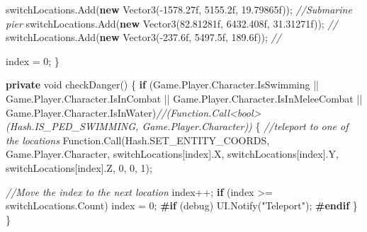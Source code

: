 \documentclass[
  openany]{book}
\newenvironment{Shaded}{\begin{snugshade}}{\end{snugshade}}
\newcommand{\CommentTok}[1]{\textcolor[rgb]{0.56,0.35,0.01}{\textit{#1}}}
\newcommand{\DataTypeTok}[1]{\textcolor[rgb]{0.13,0.29,0.53}{#1}}
\newcommand{\DecValTok}[1]{\textcolor[rgb]{0.00,0.00,0.81}{#1}}
\newcommand{\FloatTok}[1]{\textcolor[rgb]{0.00,0.00,0.81}{#1}}
\newcommand{\FunctionTok}[1]{\textcolor[rgb]{0.00,0.00,0.00}{#1}}
\newcommand{\KeywordTok}[1]{\textcolor[rgb]{0.13,0.29,0.53}{\textbf{#1}}}
\newcommand{\NormalTok}[1]{#1}
\newcommand{\StringTok}[1]{\textcolor[rgb]{0.31,0.60,0.02}{#1}}
\begin{document}
\begin{Shaded}
\begin{Highlighting}[]
\NormalTok{            switchLocations.}\FunctionTok{Add}\NormalTok{(}\KeywordTok{new} \FunctionTok{Vector3}\NormalTok{(-}\FloatTok{1578.27f}\NormalTok{, }\FloatTok{5155.2f}\NormalTok{, }\FloatTok{19.79865f}\NormalTok{)); }\CommentTok{//Submarine pier}
\NormalTok{            switchLocations.}\FunctionTok{Add}\NormalTok{(}\KeywordTok{new} \FunctionTok{Vector3}\NormalTok{(}\FloatTok{82.81281f}\NormalTok{, }\FloatTok{6432.408f}\NormalTok{, }\FloatTok{31.31271f}\NormalTok{)); }\CommentTok{//}
\NormalTok{            switchLocations.}\FunctionTok{Add}\NormalTok{(}\KeywordTok{new} \FunctionTok{Vector3}\NormalTok{(-}\FloatTok{237.6f}\NormalTok{, }\FloatTok{5497.5f}\NormalTok{, }\FloatTok{189.6f}\NormalTok{)); }\CommentTok{// }

\NormalTok{            index = }\DecValTok{0}\NormalTok{;}
\NormalTok{        \}}

        \KeywordTok{private} \DataTypeTok{void} \FunctionTok{checkDanger}\NormalTok{()}
\NormalTok{        \{}
            \KeywordTok{if}\NormalTok{ (Game.}\FunctionTok{Player}\NormalTok{.}\FunctionTok{Character}\NormalTok{.}\FunctionTok{IsSwimming}\NormalTok{ || Game.}\FunctionTok{Player}\NormalTok{.}\FunctionTok{Character}\NormalTok{.}\FunctionTok{IsInCombat}\NormalTok{ || Game.}\FunctionTok{Player}\NormalTok{.}\FunctionTok{Character}\NormalTok{.}\FunctionTok{IsInMeleeCombat}\NormalTok{ || Game.}\FunctionTok{Player}\NormalTok{.}\FunctionTok{Character}\NormalTok{.}\FunctionTok{IsInWater}\NormalTok{)}\CommentTok{//(Function.Call<bool>(Hash.IS_PED_SWIMMING, Game.Player.Character))}
\NormalTok{            \{}
                \CommentTok{//teleport to one of the locations}
\NormalTok{                Function.}\FunctionTok{Call}\NormalTok{(Hash.}\FunctionTok{SET_ENTITY_COORDS}\NormalTok{, Game.}\FunctionTok{Player}\NormalTok{.}\FunctionTok{Character}\NormalTok{, switchLocations[index].}\FunctionTok{X}\NormalTok{, switchLocations[index].}\FunctionTok{Y}\NormalTok{, switchLocations[index].}\FunctionTok{Z}\NormalTok{, }\DecValTok{0}\NormalTok{, }\DecValTok{0}\NormalTok{, }\DecValTok{1}\NormalTok{);}

                \CommentTok{//Move the index to the next location}
\NormalTok{                index++;}
                \KeywordTok{if}\NormalTok{ (index >= switchLocations.}\FunctionTok{Count}\NormalTok{) index = }\DecValTok{0}\NormalTok{;}
\KeywordTok{#if}\NormalTok{ (debug)}
\NormalTok{                UI.}\FunctionTok{Notify}\NormalTok{(}\StringTok{"Teleport"}\NormalTok{);}
\KeywordTok{#endif}
\NormalTok{            \}}
\NormalTok{        \}}


\end{Highlighting}
\end{Shaded}
\end{document}
